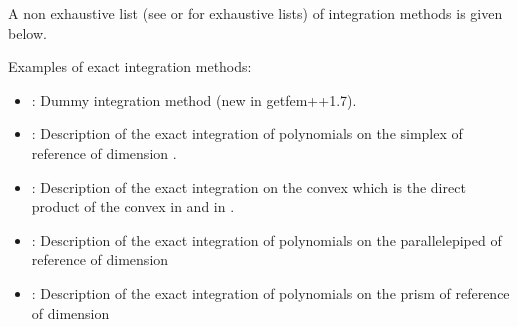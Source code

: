 \documentclass[a4paper,11pt,english]{sphinxmanual}
\begin{document}
A non exhaustive list (see {\hyperref[\detokenize{userdoc/appendixB:ud-appendixb}]{}} or
 for exhaustive lists) of integration methods
is given below.

Examples of exact integration methods:
\begin{itemize}
\item {} 
:
Dummy integration method (new in getfem++\sphinxhyphen{}1.7).

\item {} 
:
Description of the exact integration of polynomials on the simplex of reference
of dimension .

\item {} 
:
Description of the exact integration on the convex which is the direct product
of the convex in  and in .

\item {} 
:
Description of the exact integration of polynomials on the parallelepiped of
reference of dimension 

\item {} 
:
Description of the exact integration of polynomials on the prism of reference of
dimension 

\end{itemize}
\end{document}
